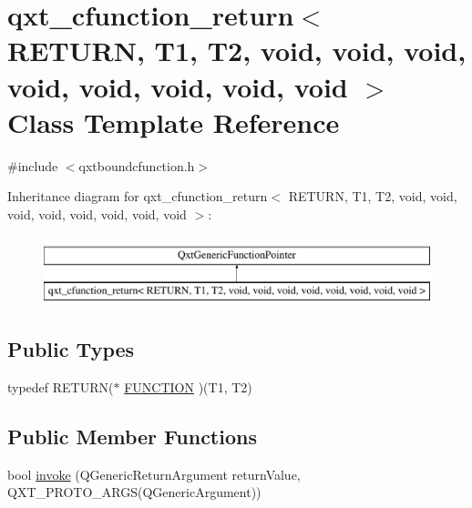 \hypertarget{classqxt__cfunction__return_3_01_r_e_t_u_r_n_00_01_t1_00_01_t2_00_01void_00_01void_00_01void_00_3960e918ee54767ca99e584f1e589c4c}{\section{qxt\-\_\-cfunction\-\_\-return$<$ R\-E\-T\-U\-R\-N, T1, T2, void, void, void, void, void, void, void, void $>$ Class Template Reference}
\label{classqxt__cfunction__return_3_01_r_e_t_u_r_n_00_01_t1_00_01_t2_00_01void_00_01void_00_01void_00_3960e918ee54767ca99e584f1e589c4c}
}


{\ttfamily \#include $<$qxtboundcfunction.\-h$>$}

Inheritance diagram for qxt\-\_\-cfunction\-\_\-return$<$ R\-E\-T\-U\-R\-N, T1, T2, void, void, void, void, void, void, void, void $>$\-:\begin{figure}[H]
\begin{center}
\leavevmode
\includegraphics[height=2.000000cm]{classqxt__cfunction__return_3_01_r_e_t_u_r_n_00_01_t1_00_01_t2_00_01void_00_01void_00_01void_00_3960e918ee54767ca99e584f1e589c4c}
\end{center}
\end{figure}
\subsection*{Public Types}
\begin{DoxyCompactItemize}
\item 
typedef R\-E\-T\-U\-R\-N($\ast$ \hyperlink{classqxt__cfunction__return_3_01_r_e_t_u_r_n_00_01_t1_00_01_t2_00_01void_00_01void_00_01void_00_3960e918ee54767ca99e584f1e589c4c_afaa3cb2255e061bc197da31b96177457}{F\-U\-N\-C\-T\-I\-O\-N} )(T1, T2)
\end{DoxyCompactItemize}
\subsection*{Public Member Functions}
\begin{DoxyCompactItemize}
\item 
bool \hyperlink{classqxt__cfunction__return_3_01_r_e_t_u_r_n_00_01_t1_00_01_t2_00_01void_00_01void_00_01void_00_3960e918ee54767ca99e584f1e589c4c_a93ae95fc17e0e97b9313e73f12d42a68}{invoke} (Q\-Generic\-Return\-Argument return\-Value, Q\-X\-T\-\_\-\-P\-R\-O\-T\-O\-\_\-A\-R\-G\-S(Q\-Generic\-Argument))
\end{DoxyCompactItemize}
